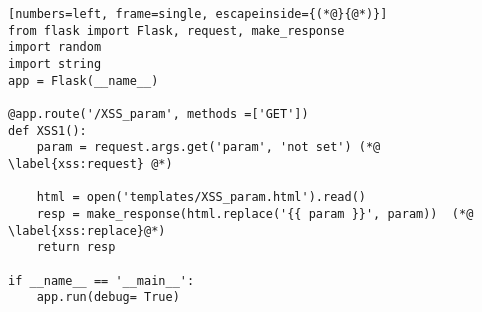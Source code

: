 \begin{lstlisting}[numbers=left, frame=single, escapeinside={(*@}{@*)}]
from flask import Flask, request, make_response
import random
import string
app = Flask(__name__)

@app.route('/XSS_param', methods =['GET'])
def XSS1():
    param = request.args.get('param', 'not set') (*@ \label{xss:request} @*)

    html = open('templates/XSS_param.html').read()
    resp = make_response(html.replace('{{ param }}', param))  (*@ \label{xss:replace}@*)
    return resp

if __name__ == '__main__':
    app.run(debug= True)
\end{lstlisting}
